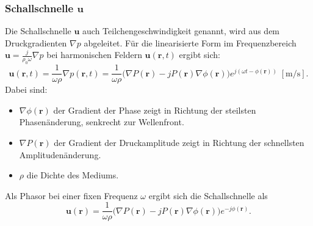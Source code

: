 \subsubsection{Schallschnelle $\boldsymbol{u}$}
% 
Die Schallschnelle $\boldsymbol{u}$ auch Teilchengeschwindigkeit
%
genannt, wird aus dem Druckgradienten $\nabla p$ abgeleitet.
%
Für die linearisierte Form im Frequenzbereich $\boldsymbol{u} =
\frac{j}{\rho_0 \omega} \nabla p$ bei harmonischen Feldern
$\boldsymbol{u}(\boldsymbol{r},t)$ ergibt sich:
\begin{equation*}
\boldsymbol{u}(\boldsymbol{r},t)
=
\frac{1}{\omega \rho} \nabla p(\boldsymbol{r},t)
=
\frac{1}{\omega \rho}
\bigl(
\nabla P(\boldsymbol{r}) 
-
jP(\boldsymbol{r})
\nabla\phi(\boldsymbol{r})
\bigr)
e^{j(\omega t -\phi(\boldsymbol{r}))}
\; [\si{\metre / \second}].
\end{equation*}
Dabei sind:
\begin{itemize}
\item
$\nabla \phi (\boldsymbol{r})$ der Gradient der Phase zeigt in
Richtung der steilsten Phasenänderung, senkrecht zur Wellenfront.
\item
$\nabla P (\boldsymbol{r})$ der Gradient der Druckamplitude zeigt
in Richtung der schnellsten Amplitudenänderung.
\item
$\rho$ die Dichte des Mediums.
\end{itemize}
Als Phasor bei einer fixen Frequenz $\omega$ ergibt sich die
Schallschnelle als
\begin{equation*}
\boldsymbol{u}(\boldsymbol{r})
=
\frac{1}{\omega \rho}  \bigl(
\nabla P(\boldsymbol{r})  - j P(\boldsymbol{r}) \nabla\phi(\boldsymbol{r})
\bigr)
e^{-j\phi (\boldsymbol{r})}.
\end{equation*}
 
 
 
 
